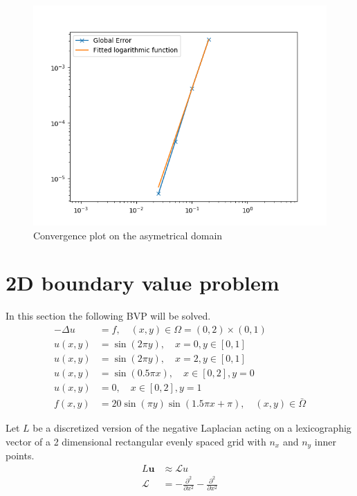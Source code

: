 \documentclass{article}
\begin{document}
\begin{figure}[H]
	\centering
	\includegraphics[width=.9\linewidth]{convergenceasym.png}
	\caption{Convergence plot on the asymetrical domain}
\end{figure}

\section{2D boundary value problem}
In this section the following BVP will be solved.
\begin{equation}
\begin{aligned}-\Delta u &=f, \quad(x, y) \in \Omega=(0,2) \times(0,1) \\ u(x, y) &=\sin (2 \pi y), \quad x=0, y \in[0,1] \\ u(x, y) &=\sin (2 \pi y), \quad x=2, y \in[0,1] \\ u(x, y) &=\sin (0.5 \pi x), \quad x \in[0,2], y=0 \\ u(x, y) &=0, \quad x \in[0,2], y=1 \\ f(x, y) &=20 \sin (\pi y) \sin (1.5 \pi x+\pi), \quad(x, y) \in \bar{\Omega} \end{aligned}
\end{equation}

    
Let $L$ be a discretized version of the negative Laplacian acting on a lexicographig vector of a 2 dimensional rectangular evenly spaced grid with $n_x$ and $n_y$ inner points.
\begin{align}
    L\mathbf{u} &\approx \mathcal{L} u\\
    \mathcal{L} &= -\frac{\partial^2}{\partial x^2} - \frac{\partial^2}{\partial x^2}
\end{align}
\end{document}
